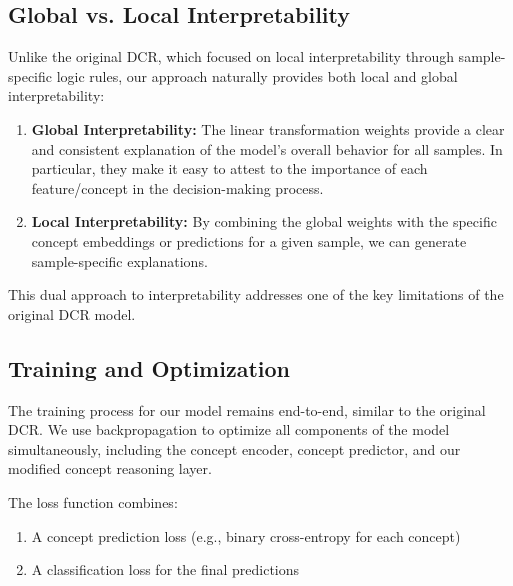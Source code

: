 \documentclass[sigconf, nonacm]{acmart}
\begin{document}
\subsection{Global vs. Local Interpretability}
\vspace{2pt}
Unlike the original DCR, which focused on local interpretability through sample-specific logic rules, our approach naturally provides both local and global interpretability: \vspace{4pt}

\begin{enumerate}
    \item \textbf{Global Interpretability:} The linear transformation weights provide a clear and consistent explanation of the model's overall behavior for all samples. In particular, they make it easy to attest to the importance of each feature/concept in the decision-making process.\vspace{8pt}
    
    \item \textbf{Local Interpretability:} By combining the global weights with the specific concept embeddings or predictions for a given sample, we can generate sample-specific explanations.
\end{enumerate}

This dual approach to interpretability addresses one of the key limitations of the original DCR model. \vspace{6pt}

\subsection{Training and Optimization}
\vspace{2pt}
The training process for our model remains end-to-end, similar to the original DCR. We use backpropagation to optimize all components of the model simultaneously, including the concept encoder, concept predictor, and our modified concept reasoning layer.

The loss function combines: \vspace{4pt}
\begin{enumerate}
    \item A concept prediction loss (e.g., binary cross-entropy for each concept) \vspace{8pt}
    \item A classification loss for the final predictions \vspace{8pt}
\end{enumerate}
\end{document}
